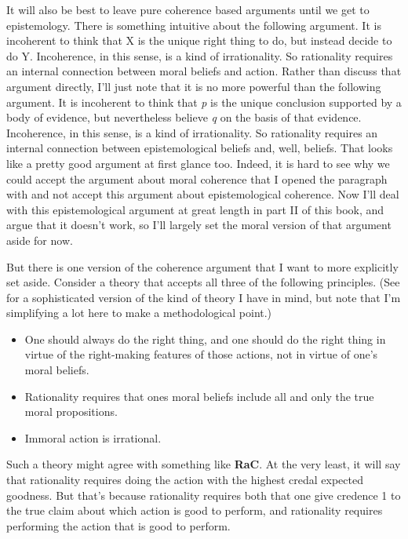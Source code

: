 It will also be best to leave pure coherence based arguments until we get to epistemology. There is something intuitive about the following argument. It is incoherent to think that X is the unique right thing to do, but instead decide to do Y. Incoherence, in this sense, is a kind of irrationality. So rationality requires an internal connection between moral beliefs and action. Rather than discuss that argument directly, I'll just note that it is no more powerful than the following argument. It is incoherent to think that \emph{p} is the unique conclusion supported by a body of evidence, but nevertheless believe \emph{q} on the basis of that evidence. Incoherence, in this sense, is a kind of irrationality. So rationality requires an internal connection between epistemological beliefs and, well, beliefs. That looks like a pretty good argument at first glance too. Indeed, it is hard to see why we could accept the argument about moral coherence that I opened the paragraph with and not accept this argument about epistemological coherence. Now I'll deal with this epistemological argument at great length in part II of this book, and argue that it doesn't work, so I'll largely set the moral version of that argument aside for now.

But there is one version of the coherence argument that I want to more explicitly set aside. Consider a theory that accepts all three of the following principles. (See \citet{Markovits2014} for a sophisticated version of the kind of theory I have in mind, but note that I'm simplifying a lot here to make a methodological point.)

\begin{itemize}
\item{} One should always do the right thing, and one should do the right thing in virtue of the right-making features of those actions, not in virtue of one's moral beliefs.

\item{} Rationality requires that ones moral beliefs include all and only the true moral propositions.

\item{} Immoral action is irrational.

\end{itemize}
Such a theory might agree with something like \textbf{RaC}. At the very least, it will say that rationality requires doing the action with the highest credal expected goodness. But that's because rationality requires both that one give credence 1 to the true claim about which action is good to perform, and rationality requires performing the action that is good to perform.

